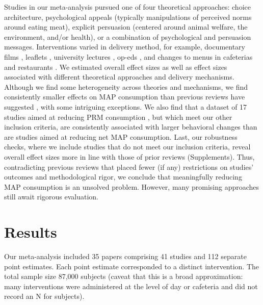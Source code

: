 \documentclass[sn-nature,referee,pdflatex]{sn-jnl}
\begin{document}
Studies in our meta-analysis pursued one of four theoretical approaches:
choice architecture, psychological appeals (typically manipulations of
perceived norms around eating meat), explicit persuasion (centered
around animal welfare, the environment, and/or health), or a combination
of psychological and persuasion messages. Interventions varied in
delivery method, for example, documentary films
\citep{mathur2021effectiveness}, leaflets \citep{peacock2017},
university lectures \citep{jalil2023}, op-eds \citep{haile2021}, and
changes to menus in cafeterias \citep{andersson2021} and restaurants
\citep{coker2022, sparkman2021}. We estimated overall effect sizes as
well as effect sizes associated with different theoretical approaches
and delivery mechanisms. Although we find some heterogeneity across
theories and mechanisms, we find consistently smaller effects on MAP
consumption than previous reviews have suggested
\citep{bianchi2018restructuring, byerly2018, chang2023, harguess2020, kwasny2022, mathur2021meta, meier2022},
with some intriguing exceptions. We also find that a dataset of 17
studies aimed at reducing PRM consumption
\citep{anderson2017, carfora2017correlational, carfora2017randomised, carfora2019, carfora2019informational, delichatsios2001talking, dijkstra2022, emmons2005cancer, emmons2005project, jaacks2014, james2015, lee2018, lindstrom2015, perino2022, schatzkin2000, sorensen2005, wolstenholme2020},
but which meet our other inclusion criteria, are consistently associated
with larger behavioral changes than are studies aimed at reducing net
MAP consumption. Last, our robustness checks, where we include studies
that do not meet our inclusion criteria, reveal overall effect sizes
more in line with those of prior reviews (Supplements). Thus,
contradicting previous reviews that placed fewer (if any) restrictions
on studies' outcomes and methodological rigor, we conclude that
meaningfully reducing MAP consumption is an unsolved problem. However,
many promising approaches still await rigorous evaluation.

\section{Results}\label{sec2}

Our meta-analysis included 35 papers comprising 41 studies and 112
separate point estimates. Each point estimate corresponded to a distinct
intervention. The total sample size 87,000 subjects (caveat that this is
a broad approximation: many interventions were administered at the level
of day or cafeteria and did not record an N for subjects).
\end{document}
